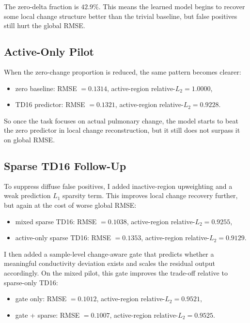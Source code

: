 \documentclass[11pt,a4paper]{article}
\begin{document}
The zero-delta fraction is $42.9\%$. This means the learned model begins to
recover some local change structure better than the trivial baseline, but false
positives still hurt the global RMSE.

\subsection{Active-Only Pilot}
When the zero-change proportion is reduced, the same pattern becomes clearer:
\begin{itemize}[leftmargin=1.5em]
    \item zero baseline: RMSE $= 0.1314$, active-region relative-$L_2 = 1.0000$,
    \item TD16 predictor: RMSE $= 0.1321$, active-region relative-$L_2 = 0.9228$.
\end{itemize}

So once the task focuses on actual pulmonary change, the model starts to beat
the zero predictor in local change reconstruction, but it still does not
surpass it on global RMSE.

\subsection{Sparse TD16 Follow-Up}
To suppress diffuse false positives, I added inactive-region upweighting and a
weak prediction $L_1$ sparsity term. This improves local change recovery
further, but again at the cost of worse global RMSE:
\begin{itemize}[leftmargin=1.5em]
    \item mixed sparse TD16: RMSE $= 0.1038$, active-region relative-$L_2 = 0.9255$,
    \item active-only sparse TD16: RMSE $= 0.1353$, active-region relative-$L_2 = 0.9129$.
\end{itemize}

I then added a sample-level change-aware gate that predicts whether a meaningful
conductivity deviation exists and scales the residual output accordingly. On the
mixed pilot, this gate improves the trade-off relative to sparse-only TD16:
\begin{itemize}[leftmargin=1.5em]
    \item gate only: RMSE $= 0.1012$, active-region relative-$L_2 = 0.9521$,
    \item gate + sparse: RMSE $= 0.1007$, active-region relative-$L_2 = 0.9525$.
\end{itemize}
\end{document}
